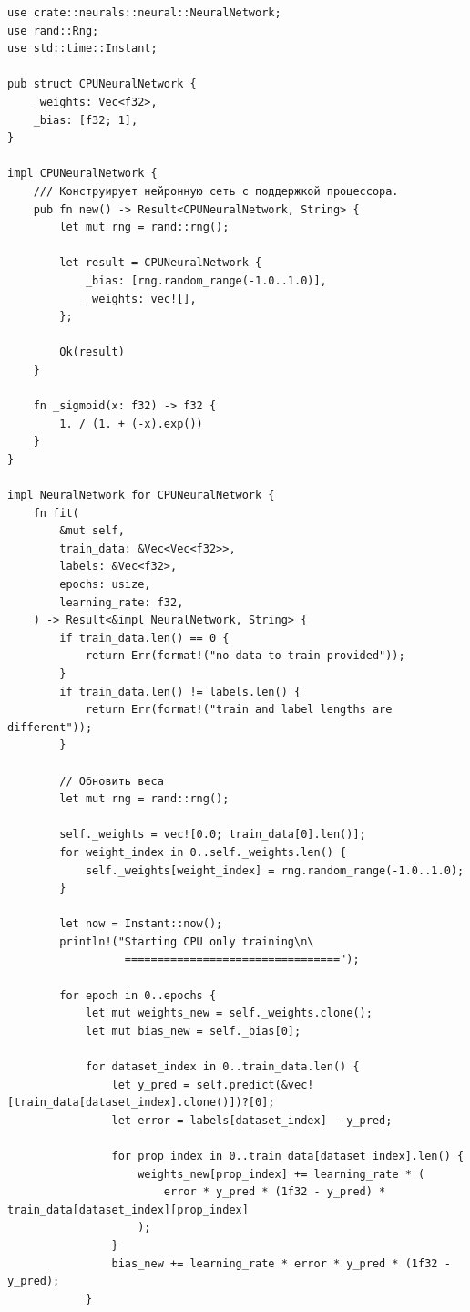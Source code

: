 \documentclass[a4paper,14pt]{extarticle}
\begin{document}
\begin{verbatim}
use crate::neurals::neural::NeuralNetwork;
use rand::Rng;
use std::time::Instant;

pub struct CPUNeuralNetwork {
    _weights: Vec<f32>,
    _bias: [f32; 1],
}

impl CPUNeuralNetwork {
    /// Конструирует нейронную сеть с поддержкой процессора.
    pub fn new() -> Result<CPUNeuralNetwork, String> {
        let mut rng = rand::rng();

        let result = CPUNeuralNetwork {
            _bias: [rng.random_range(-1.0..1.0)],
            _weights: vec![],
        };

        Ok(result)
    }

    fn _sigmoid(x: f32) -> f32 {
        1. / (1. + (-x).exp())
    }
}

impl NeuralNetwork for CPUNeuralNetwork {
    fn fit(
        &mut self,
        train_data: &Vec<Vec<f32>>,
        labels: &Vec<f32>,
        epochs: usize,
        learning_rate: f32,
    ) -> Result<&impl NeuralNetwork, String> {
        if train_data.len() == 0 {
            return Err(format!("no data to train provided"));
        }
        if train_data.len() != labels.len() {
            return Err(format!("train and label lengths are different"));
        }

        // Обновить веса
        let mut rng = rand::rng();

        self._weights = vec![0.0; train_data[0].len()];
        for weight_index in 0..self._weights.len() {
            self._weights[weight_index] = rng.random_range(-1.0..1.0);
        }

        let now = Instant::now();
        println!("Starting CPU only training\n\
                  =================================");

        for epoch in 0..epochs {
            let mut weights_new = self._weights.clone();
            let mut bias_new = self._bias[0];

            for dataset_index in 0..train_data.len() {
                let y_pred = self.predict(&vec![train_data[dataset_index].clone()])?[0];
                let error = labels[dataset_index] - y_pred;

                for prop_index in 0..train_data[dataset_index].len() {
                    weights_new[prop_index] += learning_rate * (
                        error * y_pred * (1f32 - y_pred) * train_data[dataset_index][prop_index]
                    );
                }
                bias_new += learning_rate * error * y_pred * (1f32 - y_pred);
            }


\end{verbatim}
\end{document}
